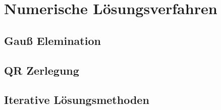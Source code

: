 \chapter{Numerische Lösungsverfahren}

\section{Gauß Elemination}

\section{QR Zerlegung}

\section{Iterative Lösungsmethoden}




